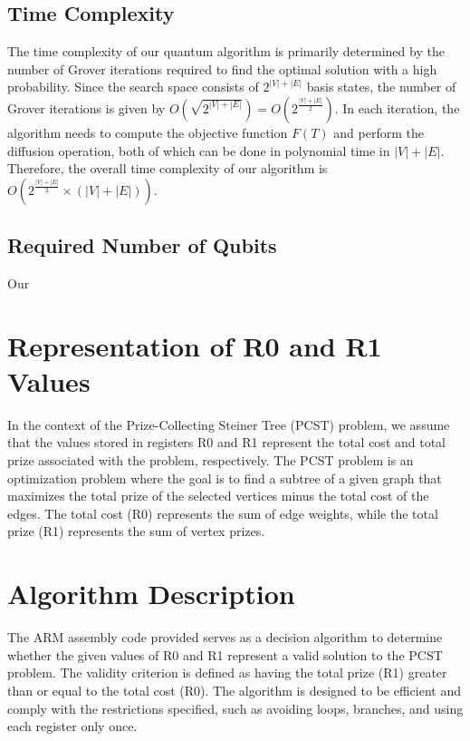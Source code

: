 \subsection{Time Complexity}

The time complexity of our quantum algorithm is primarily determined by the number of Grover iterations required to find the optimal solution with a high probability. Since the search space consists of $2^{|V|+|E|}$ basis states, the number of Grover iterations is given by $O(\sqrt{2^{|V|+|E|}}) = O(2^{\frac{|V|+|E|}{2}})$. In each iteration, the algorithm needs to compute the objective function $F(T)$ and perform the diffusion operation, both of which can be done in polynomial time in $|V| + |E|$. Therefore, the overall time complexity of our algorithm is $O(2^{\frac{|V|+|E|}{2}} \times (|V| + |E|))$.

\subsection{Required Number of Qubits}

Our

\section{Representation of R0 and R1 Values}

In the context of the Prize-Collecting Steiner Tree (PCST) problem, we assume that the values stored in registers R0 and R1 represent the total cost and total prize associated with the problem, respectively. The PCST problem is an optimization problem where the goal is to find a subtree of a given graph that maximizes the total prize of the selected vertices minus the total cost of the edges. The total cost (R0) represents the sum of edge weights, while the total prize (R1) represents the sum of vertex prizes.

\section{Algorithm Description}

The ARM assembly code provided serves as a decision algorithm to determine whether the given values of R0 and R1 represent a valid solution to the PCST problem. The validity criterion is defined as having the total prize (R1) greater than or equal to the total cost (R0). The algorithm is designed to be efficient and comply with the restrictions specified, such as avoiding loops, branches, and using each register only once.

